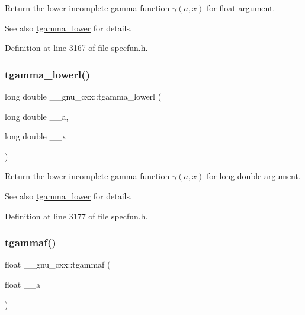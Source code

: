 Return the lower incomplete gamma function $ \gamma(a,x) $ for {\ttfamily float} argument.

\begin{DoxySeeAlso}{See also}
\hyperlink{group__mathsf__gnu_gaed107908dec8865ea48e7764f7ea88a2}{tgamma\+\_\+lower} for details. 
\end{DoxySeeAlso}


Definition at line 3167 of file specfun.\+h.

\mbox{\label{group__mathsf__gnu_gad057fe49a5bf95b1550f5f0a6e60bb19}} 
\subsubsection{\texorpdfstring{tgamma\+\_\+lowerl()}{tgamma\_lowerl()}}
{\footnotesize\ttfamily long double \+\_\+\+\_\+gnu\+\_\+cxx\+::tgamma\+\_\+lowerl (\begin{DoxyParamCaption}\item[{long double}]{\+\_\+\+\_\+a,  }\item[{long double}]{\+\_\+\+\_\+x }\end{DoxyParamCaption})\hspace{0.3cm}{\ttfamily [inline]}}

Return the lower incomplete gamma function $ \gamma(a,x) $ for {\ttfamily long double} argument.

\begin{DoxySeeAlso}{See also}
\hyperlink{group__mathsf__gnu_gaed107908dec8865ea48e7764f7ea88a2}{tgamma\+\_\+lower} for details. 
\end{DoxySeeAlso}


Definition at line 3177 of file specfun.\+h.

\mbox{\label{group__mathsf__gnu_ga008b1f4cc3a54c9c8221ad1f3504b593}} 
\subsubsection{\texorpdfstring{tgammaf()}{tgammaf()}\hspace{0.1cm}{\footnotesize\ttfamily [1/3]}}
{\footnotesize\ttfamily float \+\_\+\+\_\+gnu\+\_\+cxx\+::tgammaf (\begin{DoxyParamCaption}\item[{float}]{\+\_\+\+\_\+a }\end{DoxyParamCaption})\hspace{0.3cm}{\ttfamily [inline]}}

